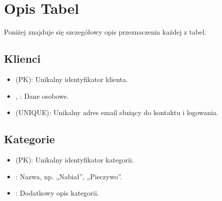 \documentclass[a4paper,11pt,polish]{sphinxmanual}
\begin{document}
\section{Opis Tabel}
\label{\detokenize{rozdzial_3:opis-tabel}}
\sphinxAtStartPar
Poniżej znajduje się szczegółowy opis przeznaczenia każdej z tabel.


\subsection{Klienci}
\label{\detokenize{rozdzial_3:klienci}}\begin{description}
\begin{itemize}
\item {} 
\sphinxAtStartPar
{} (PK): Unikalny identyfikator klienta.

\item {} 
\sphinxAtStartPar
{}, : Dane osobowe.

\item {} 
\sphinxAtStartPar
{} (UNIQUE): Unikalny adres email służący do kontaktu i logowania.

\end{itemize}

\end{description}


\subsection{Kategorie}
\label{\detokenize{rozdzial_3:kategorie}}\begin{description}
\begin{itemize}
\item {} 
\sphinxAtStartPar
{} (PK): Unikalny identyfikator kategorii.

\item {} 
\sphinxAtStartPar
{}: Nazwa, np. „Nabiał”, „Pieczywo”.

\item {} 
\sphinxAtStartPar
{}: Dodatkowy opis kategorii.

\end{itemize}

\end{description}
\end{document}
